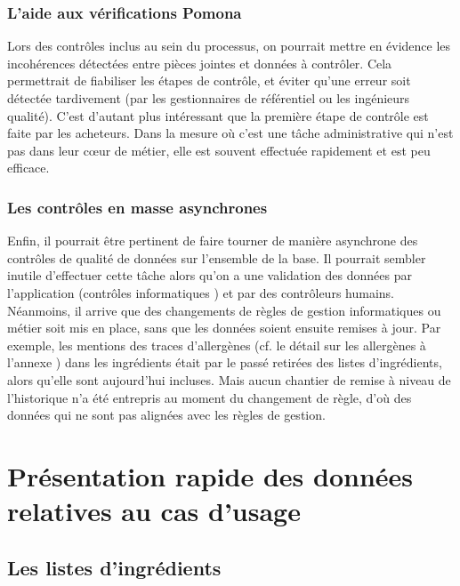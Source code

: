             \subsection{L'aide aux vérifications Pomona}
            Lors des contrôles inclus au sein du processus, on pourrait mettre en évidence les incohérences détectées entre pièces jointes et données à contrôler.
            Cela permettrait de fiabiliser les étapes de contrôle, et éviter qu'une erreur soit détectée tardivement (par les gestionnaires de référentiel ou les ingénieurs qualité).
            C'est d'autant plus intéressant que la première étape de contrôle est faite par les acheteurs.
            Dans la mesure où c'est une tâche administrative qui n'est pas dans leur c{\oe}ur de métier, elle est souvent effectuée rapidement et est peu efficace.

            \subsection{Les contrôles en masse asynchrones}
            Enfin, il pourrait être pertinent de faire tourner de manière asynchrone des contrôles de qualité de données sur l'ensemble de la base.
            Il pourrait sembler inutile d'effectuer cette tâche alors qu'on a une validation des données par l'application (contrôles \og informatiques \fg) et par des contrôleurs humains.
            Néanmoins, il arrive que des changements de règles de gestion informatiques ou métier soit mis en place, sans que les données soient ensuite remises à jour.
            Par exemple, les mentions des traces d'allergènes (cf. le détail sur les allergènes à l'annexe ) dans les ingrédients était par le passé retirées des listes d'ingrédients, alors qu'elle sont aujourd'hui incluses. 
            Mais aucun chantier de remise à niveau de l'historique n'a été entrepris au moment du changement de règle, d'où des données qui ne sont pas alignées avec les règles de gestion.


    \chapter{Présentation rapide des données relatives au cas d'usage}

        \section{Les listes d'ingrédients}
        \label{listes_ingredients}

